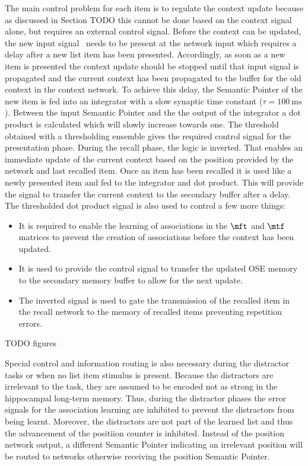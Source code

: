 The main control problem for each item is to regulate the context update because as discussed in Section TODO this cannot be done based on the context signal alone, but requires an external control signal.
Before the context can be updated, the new input signal \ctxin\ needs to be present at the network input which requires a delay after a new list item has been presented.
Accordingly, as soon as a new item is presented the context update should be stopped until that input signal is propagated and the current context has been propagated to the buffer for the old context in the context network.
To achieve this delay, the Semantic Pointer of the new item is fed into an integrator with a slow synaptic time constant ($\tau = \SI{100}{\milli\second}$).
Between the input Semantic Pointer and the the output of the integrator a dot product is calculated which will slowly increase towards one.
The threshold obtained with a thresholding ensemble gives the required control signal for the presentation phase.
During the recall phase, the logic is inverted.
That enables an immediate update of the current context based on the position provided by the  network and last recalled item.
Once an item has been recalled it is used like a newly presented item and fed to the integrator and dot product.
This will provide the signal to transfer the current context to the secondary buffer after a delay.
The thresholded dot product signal is also used to control a few more things:
\begin{itemize}
    \item It is required to enable the learning of associations in the $\mft$ and $\mtf$ matrices to prevent the creation of associations before the context has been updated.
    \item It is used to provide the control signal to transfer the updated OSE memory to the secondary memory buffer to allow for the next update.
    \item The inverted signal is used to gate the transmission of the recalled item in the recall network to the memory of recalled items preventing repetition errors.
\end{itemize}
TODO figures

Special control and information routing is also necessary during the distractor tasks or when no list item stimulus is present.
Because the distractors are irrelevant to the task, they are assumed to be encoded not as strong in the hippocampal long-term memory.
Thus, during the distractor phases the error signals for the association learning are inhibited to prevent the distractors from being learnt.
Moreover, the distractors are not part of the learned list and thus the advancement of the positiion counter is inhibited.
Instead of the position network output, a different Semantic Pointer indicating an irrelevant position will be routed to networks otherwise receiving the position Semantic Pointer. 

